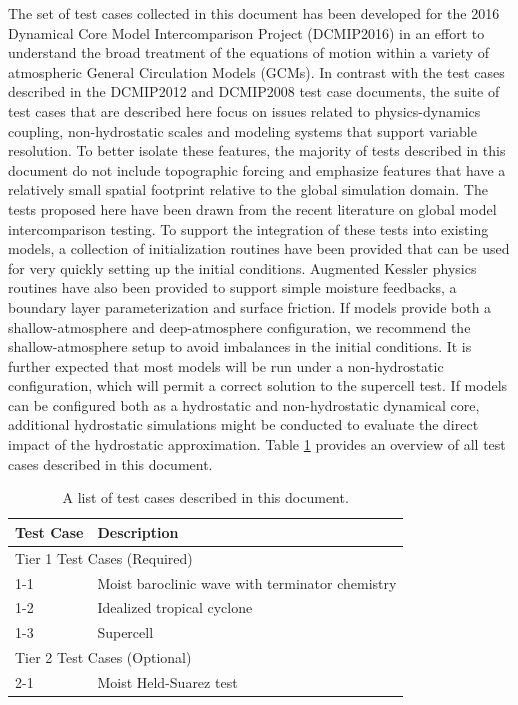 \documentclass[times,doublespace]{fldauth}
\newcommand\T{\rule{0pt}{2.6ex}}
\newcommand\B{\rule[-1.2ex]{0pt}{0pt}}
\begin{document}
The set of test cases collected in this document has been developed for the 2016 Dynamical Core Model Intercomparison Project (DCMIP2016) in an effort to understand the broad treatment of the equations of motion within a variety of atmospheric General Circulation Models (GCMs). In contrast with the test cases described in the DCMIP2012 and DCMIP2008 test case documents, the suite of test cases that are described here focus on issues related to physics-dynamics coupling, non-hydrostatic scales and modeling systems that support variable resolution.  To better isolate these features, the majority of tests described in this document do not include topographic forcing and emphasize features that have a relatively small spatial footprint relative to the global simulation domain.  The tests proposed here have been drawn from the recent literature on global model intercomparison testing.  To support the integration of these tests into existing models, a collection of initialization routines have been provided that can be used for very quickly setting up the initial conditions.  Augmented Kessler physics routines have also been provided to support simple moisture feedbacks, a boundary layer parameterization and surface friction.  If models provide both a shallow-atmosphere and deep-atmosphere configuration, we recommend the shallow-atmosphere setup to avoid imbalances in the initial conditions. It is further expected that most models will be run under a non-hydrostatic configuration, which will permit a correct solution to the supercell test.  If models can be configured both as a hydrostatic and non-hydrostatic dynamical core, additional hydrostatic simulations might be conducted to evaluate the direct impact of the hydrostatic approximation.  Table \ref{tab:TestCases} provides an overview of all test cases described in this document.

\begin{table}[h]

\caption{A list of test cases described in this document.} \label{tab:TestCases}
\begin{tabular*}{\textwidth}{@{\extracolsep{\fill}}ll}
\hline Test Case \T \B& Description \\
\hline \multicolumn{2}{l}{Tier 1 Test Cases (Required)} \T \B \\
\hline 
1-1 \T & Moist baroclinic wave with terminator chemistry \\
1-2 \T & Idealized tropical cyclone \\
1-3 \T & Supercell \\
\hline \multicolumn{2}{l}{Tier 2 Test Cases (Optional)} \T \B \\  \hline 
2-1 \T \B & Moist Held-Suarez test  \\ \hline
\hline 
\end{tabular*}

\end{table}
\end{document}
